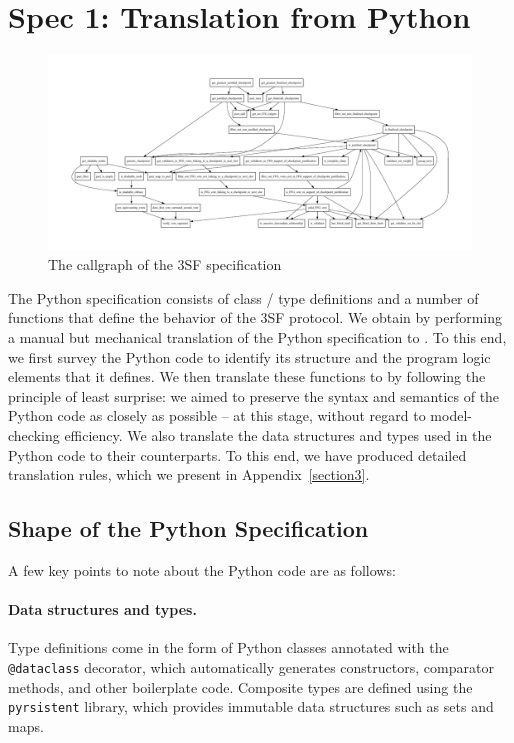 
\section{Spec 1: Translation from Python}\label{sec:spec1}

\begin{figure}
    \centering
    \includegraphics[width=.9\textheight,angle=-90]{ffg-callgraph.pdf}
    \caption{The callgraph of the 3SF specification}
    \label{fig:callgraph}
\end{figure}

The Python specification consists of class / type definitions and a number of
functions that define the behavior of the 3SF protocol. We obtain \SpecOne{} by
performing a manual but mechanical translation of the Python specification to
\tlap{}. To this end, we first survey the Python code to identify its structure
and the program logic elements that it defines. We then translate these
functions to \tlap{} by following the principle of least surprise: we aimed to
preserve the syntax and semantics of the Python code as closely as possible --
at this stage, without regard to model-checking efficiency. We also translate
the data structures and types used in the Python code to their \tlap{}
counterparts. To this end, we have produced detailed translation rules, which we
present in Appendix~\ref{section3}.

\subsection{Shape of the Python Specification}

A few key points to note about the Python code are as follows:

\paragraph{Data structures and types.} Type definitions come in the form of
Python classes annotated with the \texttt{@dataclass} decorator, which
automatically generates constructors, comparator methods, and other boilerplate
code. Composite types are defined using the \texttt{pyrsistent} library, which
provides immutable data structures such as sets and maps.

